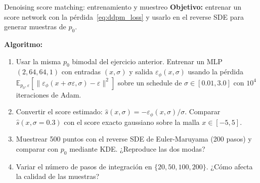 \begin{ejerciciocomp}{Denoising score matching: entrenamiento y muestreo}
\textbf{Objetivo:} entrenar un score network con la pérdida~\eqref{eq:ddpm_loss}
y usarlo en el reverse SDE para generar muestras de $p_0$.

\medskip\noindent\textbf{Algoritmo:}
\begin{enumerate}
  \item Usar la misma $p_0$ bimodal del ejercicio anterior. Entrenar un MLP
        $(2, 64, 64, 1)$ con entradas $(x, \sigma)$ y salida $\varepsilon_\phi(x,\sigma)$
        usando la pérdida $\mathbb{E}_{p_0,\varepsilon}[\|\varepsilon_\phi(x +
        \sigma\varepsilon, \sigma) - \varepsilon\|^2]$ sobre un schedule de
        $\sigma \in [0.01, 3.0]$ con $10^4$ iteraciones de Adam.
  \item Convertir el score estimado: $\hat{s}(x,\sigma) = -\varepsilon_\phi(x,\sigma)/\sigma$.
        Comparar $\hat{s}(x, \sigma=0.3)$ con el score exacto gaussiano sobre
        la malla $x \in [-5, 5]$.
  \item Muestrear 500 puntos con el reverse SDE de Euler-Maruyama (200 pasos)
        y comparar con $p_0$ mediante KDE. ¿Reproduce las dos modas?
  \item Variar el número de pasos de integración en $\{20, 50, 100, 200\}$.
        ¿Cómo afecta la calidad de las muestras?
\end{enumerate}
\end{ejerciciocomp}

